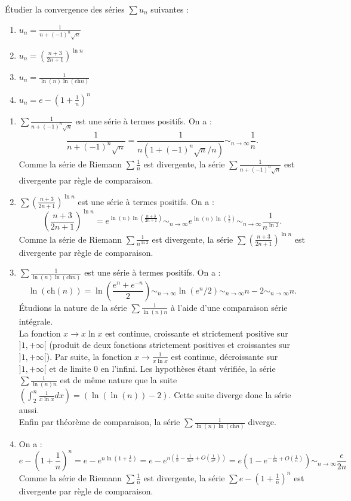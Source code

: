 \documentclass{book}
\begin{document}
\begin{Exercice}[Nature]
Étudier la convergence des séries $\sum u_n$ suivantes :\\
    \begin{enumerate}
        \item  $u_n=\frac{1}{n+(-1)^n\sqrt{n}}$
        \item $u_n=\left(\frac{n+3}{2n+1}\right)^{\ln n}$
        \item  $u_n=\frac{1}{\ln(n)\ln(\text{ch} n)}$
        \item  $u_n=e-\left(1+\frac{1}{n}\right)^n$
      \end{enumerate}      
       



\begin{Correction}
    \begin{enumerate}
        \item $\sum \frac{1}{n+(-1)^n\sqrt{n}}$ est une série à termes positifs. On a :
$$\frac{1}{n+(-1)^n\sqrt{n}} = \frac{1}{n(1+(-1)^n\sqrt{n}/n)}\sim_{n\to\infty}\frac{1}{n}.$$
Comme la série de Riemann $\sum \frac{1}{n}$ est divergente, la série $\sum \frac{1}{n+(-1)^n\sqrt{n}}$ est divergente par règle de comparaison.
        \item $\sum \left(\frac{n+3}{2n+1}\right)^{\ln n}$ est une série à termes positifs. On a :
$$\left(\frac{n+3}{2n+1}\right)^{\ln n} =e^{\ln(n)\ln\left(\frac{n+3}{2n+1}\right) } \sim_{n\to\infty}e^{\ln(n)\ln\left(\frac{1}{2}\right) }\sim_{n\to\infty}\frac{1}{n^{\ln 2}} .$$
Comme la série de Riemann $\sum \frac{1}{n^{\ln 2}}$ est divergente, la série $\sum \left(\frac{n+3}{2n+1}\right)^{\ln n}$ est divergente par règle de comparaison.
\item $\sum\frac{1}{\ln(n)\ln(\text{ch} n)}$ est une série à termes positifs. On a :
$$\ln(\text{ch}(n)) = \ln\left(  \frac{e^n+e^{-n}}{2}\right)\sim_{n\to\infty}\ln(e^n/2  )\sim_{n\to\infty}n-2\sim_{n\to\infty}n.$$
Étudions la nature de la série $\sum \frac{1}{\ln(n)n}$ à l'aide d'une comparaison série intégrale.\\
La fonction $x\rightarrow x\ln x$ est continue, croissante et strictement positive sur $]1,+\infty[$ (produit de deux fonctions strictement positives et croissantes sur $]1,+\infty[$). Par suite, la fonction $x\rightarrow\frac{1}{x\ln x}$ est continue, décroissante sur $]1,+\infty[$ et de limite 0 en l'infini. Les hypothèses étant vérifiée, la série $\sum \frac{1}{\ln(n)n}$ est de même nature que la suite $\left(\int_{2}^n \frac{1}{x\ln x}dx\right)=\left(\ln(\ln(n))-2\right)$. Cette suite diverge donc la série aussi.\\
Enfin par théorème de comparaison, la série $\sum\frac{1}{\ln(n)\ln(\text{ch} n)}$ diverge.
\item On a :
$$ e-\left(1+\frac{1}{n}\right)^n=e-e^{n\ln(1+\frac{1}{n})}=e-e^{n(\frac{1}{n}-\frac{1}{2n^2}+O(\frac{1}{n^2}))}=e(1-e^{-\frac{1}{2n}+O(\frac{1}{n})})\sim_{n\to\infty}\frac{e}{2n}  $$
Comme la série de Riemann $\sum \frac{1}{n}$ est divergente, la série $\sum e-\left(1+\frac{1}{n}\right)^n$ est divergente par règle de comparaison.
    \end{enumerate}
\end{Correction}
\end{Exercice}
\end{document}
